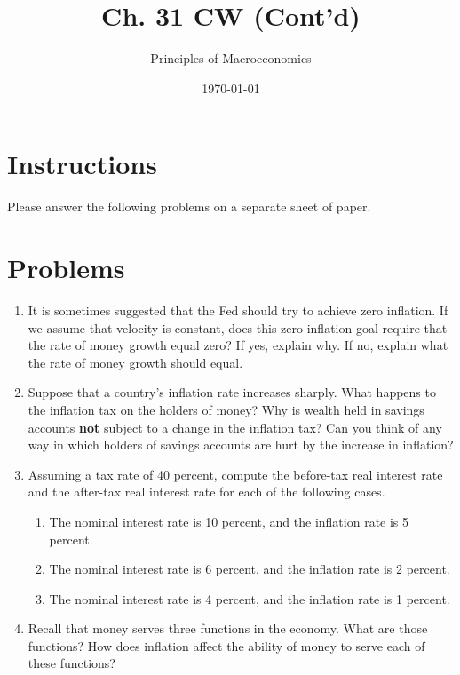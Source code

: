 \documentclass{article}
\title{Ch. 31 CW (Cont'd)}
\author{Principles of Macroeconomics}
\date{\today}
\begin{document}
\maketitle

\section*{Instructions}
Please answer the following problems on a separate sheet of paper.

\section*{Problems}

\begin{enumerate}

\item It is sometimes suggested that the Fed should try to achieve zero inflation. If we assume that velocity is constant, does this zero-inflation goal require that the rate of money growth equal zero? If yes, explain why. If no, explain what the rate of money growth should equal.

\item Suppose that a country's inflation rate increases sharply. What happens to the inflation tax on the holders of money? Why is wealth held in savings accounts \textbf{not} subject to a change in the inflation tax? Can you think of any way in which holders of savings accounts are hurt by the increase in inflation?

\item Assuming a tax rate of 40 percent, compute the before-tax real interest rate and the after-tax real interest rate for each of the following cases.

	\begin{enumerate}
	
	\item The nominal interest rate is 10 percent, and the inflation rate is 5 percent.
	
	\item The nominal interest rate is 6 percent, and the inflation rate is 2 percent.
	
	\item The nominal interest rate is 4 percent, and the inflation rate is 1 percent.
	
	\end{enumerate}
	
\item Recall that money serves three functions in the economy. What are those functions? How does inflation affect the ability of money to serve each of these functions?


\end{enumerate}
\end{document}
